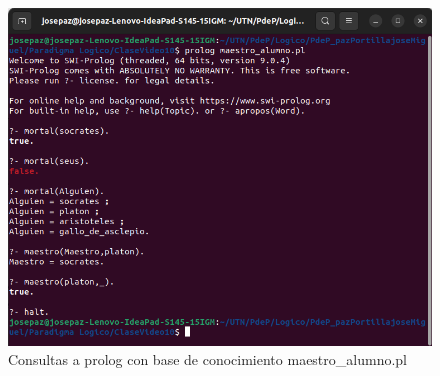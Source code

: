 \documentclass[11pt,a4paper]{article}
\begin{document}
\begin{figure}[H]
	\centering
	\includegraphics[scale=0.6]{figuras/maestro_alumno.png}
    \caption{Consultas a prolog con base de conocimiento maestro\_alumno.pl}
    \label{fig:maestro alumno}
\end{figure} 



\newpage

\appendix

%
%
%
\end{document}
